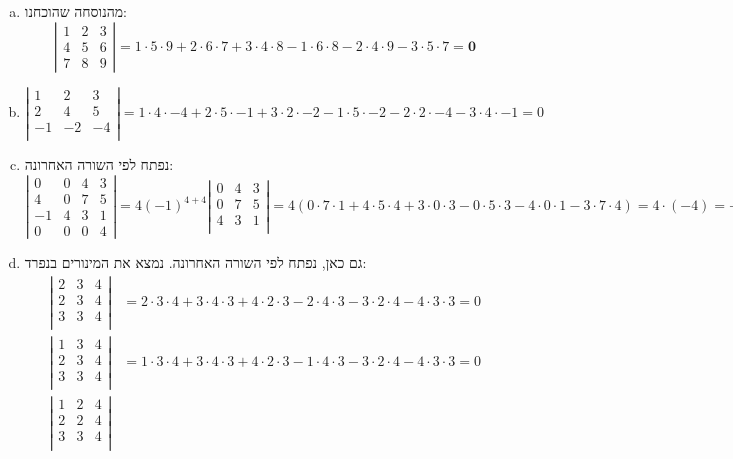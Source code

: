 \documentclass[]{article}
\newcommand\detms[1]   {\sof{\begin{matrix}
            #1
\end{matrix}}}
\newcommand\sof[1]    {\left | #1 \right |}
\theoremstyle{definition}
\begin{document}
    \begin{enumerate}[(a)]
        \item מהנוסחה שהוכחנו: 
        \[ \detms{1 &2 & 3 \\ 4 & 5 & 6 \\ 7 & 8 & 9} = 1 \cdot 5 \cdot 9 + 2 \cdot 6 \cdot 7 + 3 \cdot 4 \cdot 8 - 1 \cdot 6 \cdot 8 - 2 \cdot 4 \cdot 9 - 3 \cdot 5 \cdot 7 = \bm{0} \]
        \item 
        \[ \detms{1 & 2 & 3 \\ 
            2 & 4 & 5 \\ 
            -1 & -2 & -4 \\ 
        }= 1 \cdot 4 \cdot -4 + 2 \cdot 5 \cdot -1 + 3 \cdot 2 \cdot -2 - 1 \cdot 5 \cdot -2 - 2 \cdot 2 \cdot -4 - 3 \cdot 4 \cdot -1 = 0 \]
        \item נפתח לפי השורה האחרונה: 
        \[ \detms{0 & 0 & 4 & 3 \\ 4 & 0 & 7 & 5 \\ -1 & 4 & 3 & 1 \\ 0 & 0 & 0 & 4} = 4(-1)^{4+4} \detms{0 & 4 & 3 \\ 
            0 & 7 & 5 \\ 
            4 & 3 & 1 \\ 
        }= 4(0 \cdot 7 \cdot 1 + 4 \cdot 5 \cdot 4 + 3 \cdot 0 \cdot 3 - 0 \cdot 5 \cdot 3 - 4 \cdot 0 \cdot 1 - 3 \cdot 7 \cdot 4) = 4 \cdot (-4) = -16 \]
        \item גם כאן, נפתח לפי השורה האחרונה. נמצא את המינורים בנפרד: 
        \begin{align*}
            \detms{2 & 3 & 4 \\ 
                2 & 3 & 4 \\ 
                3 & 3 & 4 \\ 
            } &= 2 \cdot 3 \cdot 4 + 3 \cdot 4 \cdot 3 + 4 \cdot 2 \cdot 3 - 2 \cdot 4 \cdot 3 - 3 \cdot 2 \cdot 4 - 4 \cdot 3 \cdot 3 = 0 \\
            \detms{1 & 3 & 4 \\ 
                    2 & 3 & 4 \\ 
                    3 & 3 & 4 \\ 
                } &= 1 \cdot 3 \cdot 4 + 3 \cdot 4 \cdot 3 + 4 \cdot 2 \cdot 3 - 1 \cdot 4 \cdot 3 - 3 \cdot 2 \cdot 4 - 4 \cdot 3 \cdot 3 = 0 \\
            \detms{1 & 2 & 4 \\ 
                2 & 2 & 4 \\ 
                3 & 3 & 4 \\ 
}
\end{align*}
\end{enumerate}
\end{document}
